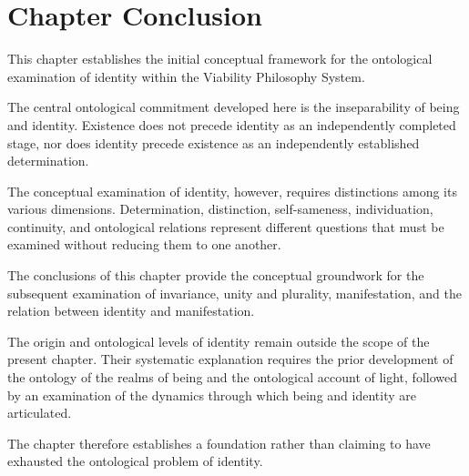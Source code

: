 



\section*{Chapter Conclusion}

This chapter establishes the initial conceptual
framework for the ontological examination of identity
within the Viability Philosophy System.

The central ontological commitment developed here is
the inseparability of being and identity. Existence
does not precede identity as an independently
completed stage, nor does identity precede existence
as an independently established determination.

The conceptual examination of identity, however,
requires distinctions among its various dimensions.
Determination, distinction, self-sameness,
individuation, continuity, and ontological relations
represent different questions that must be examined
without reducing them to one another.

The conclusions of this chapter provide the conceptual
groundwork for the subsequent examination of
invariance, unity and plurality, manifestation, and
the relation between identity and manifestation.

The origin and ontological levels of identity remain
outside the scope of the present chapter. Their
systematic explanation requires the prior development
of the ontology of the realms of being and the
ontological account of light, followed by an
examination of the dynamics through which being and
identity are articulated.

The chapter therefore establishes a foundation rather
than claiming to have exhausted the ontological problem
of identity.


